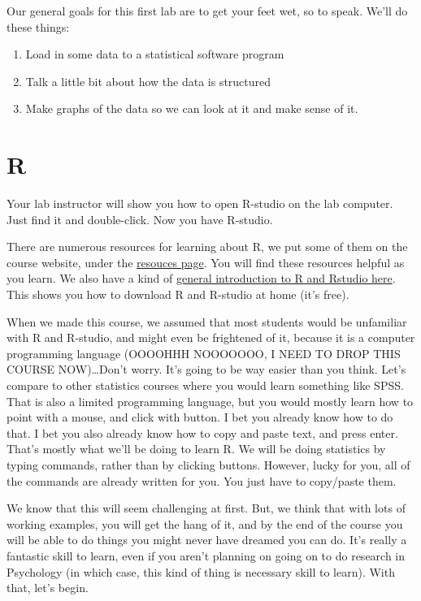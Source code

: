 \documentclass[]{book}
\providecommand{\tightlist}{%
  \setlength{\itemsep}{0pt}\setlength{\parskip}{0pt}}
\theoremstyle{definition}
\theoremstyle{definition}
\theoremstyle{definition}
\theoremstyle{remark}
\begin{document}
Our general goals for this first lab are to get your feet wet, so to
speak. We'll do these things:

\begin{enumerate}
\def\labelenumi{\arabic{enumi}.}
\tightlist
\item
  Load in some data to a statistical software program
\item
  Talk a little bit about how the data is structured
\item
  Make graphs of the data so we can look at it and make sense of it.
\end{enumerate}

\section{R}\label{r-1}

Your lab instructor will show you how to open R-studio on the lab
computer. Just find it and double-click. Now you have R-studio.

There are numerous resources for learning about R, we put some of them
on the course website, under the
\href{https://crumplab.github.io/psyc3400/Resources.html}{resouces
page}. You will find these resources helpful as you learn. We also have
a kind of \href{}{general introduction to R and Rstudio here}. This
shows you how to download R and R-studio at home (it's free).

When we made this course, we assumed that most students would be
unfamiliar with R and R-studio, and might even be frightened of it,
because it is a computer programming language (OOOOHHH NOOOOOOO, I NEED
TO DROP THIS COURSE NOW)\ldots{}Don't worry. It's going to be way easier
than you think. Let's compare to other statistics courses where you
would learn something like SPSS. That is also a limited programming
language, but you would mostly learn how to point with a mouse, and
click with button. I bet you already know how to do that. I bet you also
already know how to copy and paste text, and press enter. That's mostly
what we'll be doing to learn R. We will be doing statistics by typing
commands, rather than by clicking buttons. However, lucky for you, all
of the commands are already written for you. You just have to copy/paste
them.

We know that this will seem challenging at first. But, we think that
with lots of working examples, you will get the hang of it, and by the
end of the course you will be able to do things you might never have
dreamed you can do. It's really a fantastic skill to learn, even if you
aren't planning on going on to do research in Psychology (in which case,
this kind of thing is necessary skill to learn). With that, let's begin.
\end{document}
